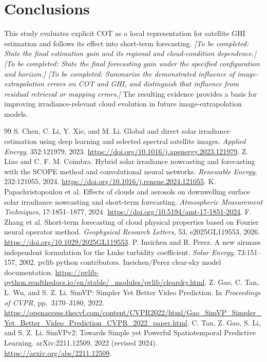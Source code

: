 \documentclass[11pt]{article}
\newcommand{\pending}[1]{\textit{[To be completed: #1]}}
\begin{document}
\section{Conclusions}
This study evaluates explicit COT as a local representation for satellite GHI estimation and follows its effect into short-term forecasting. \pending{State the final estimation gain and its regional and cloud-condition dependence.} \pending{State the final forecasting gain under the specified configuration and horizon.} \pending{Summarize the demonstrated influence of image-extrapolation errors on COT and GHI, and distinguish that influence from residual retrieval or mapping errors.} The resulting evidence provides a basis for improving irradiance-relevant cloud evolution in future image-extrapolation models.
\FloatBarrier
\begin{thebibliography}{99}\small
{}
S. Chen, C. Li, Y. Xie, and M. Li.
Global and direct solar irradiance estimation using deep learning and selected spectral satellite images.
\textit{Applied Energy}, 352:121979, 2023.
\url{https://doi.org/10.1016/j.apenergy.2023.121979}.
Z. Liao and C. F. M. Coimbra.
Hybrid solar irradiance nowcasting and forecasting with the SCOPE method and convolutional neural networks.
\textit{Renewable Energy}, 232:121055, 2024.
\url{https://doi.org/10.1016/j.renene.2024.121055}.
K. Papachristopoulou et al.
Effects of clouds and aerosols on downwelling surface solar irradiance nowcasting and short-term forecasting.
\textit{Atmospheric Measurement Techniques}, 17:1851--1877, 2024.
\url{https://doi.org/10.5194/amt-17-1851-2024}.
F. Zhang et al.
Short-term forecasting of cloud physical properties based on Fourier neural operator method.
\textit{Geophysical Research Letters}, 53, e2025GL119553, 2026.
\url{https://doi.org/10.1029/2025GL119553}.
P. Ineichen and R. Perez.
A new airmass independent formulation for the Linke turbidity coefficient.
\textit{Solar Energy}, 73:151--157, 2002.
pvlib python contributors.
Ineichen/Perez clear-sky model documentation.
\url{https://pvlib-python.readthedocs.io/en/stable/_modules/pvlib/clearsky.html}.
Z. Gao, C. Tan, L. Wu, and S. Z. Li.
SimVP: Simpler Yet Better Video Prediction.
In \textit{Proceedings of CVPR}, pp.~3170--3180, 2022.
\url{https://openaccess.thecvf.com/content/CVPR2022/html/Gao_SimVP_Simpler_Yet_Better_Video_Prediction_CVPR_2022_paper.html}.
C. Tan, Z. Gao, S. Li, and S. Z. Li.
SimVPv2: Towards Simple yet Powerful Spatiotemporal Predictive Learning.
arXiv:2211.12509, 2022 (revised 2024).
\url{https://arxiv.org/abs/2211.12509}.
\end{thebibliography}
\end{document}
